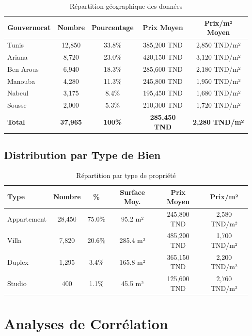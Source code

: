 \begin{table}[H]
\centering
\caption{Répartition géographique des données}
\begin{tabular}{|l|c|c|c|c|}
\hline
\textbf{Gouvernorat} & \textbf{Nombre} & \textbf{Pourcentage} & \textbf{Prix Moyen} & \textbf{Prix/m² Moyen} \\
\hline
Tunis & 12,850 & 33.8\% & 385,200 TND & 2,850 TND/m² \\
Ariana & 8,720 & 23.0\% & 420,150 TND & 3,120 TND/m² \\
Ben Arous & 6,940 & 18.3\% & 285,600 TND & 2,180 TND/m² \\
Manouba & 4,280 & 11.3\% & 245,800 TND & 1,950 TND/m² \\
Nabeul & 3,175 & 8.4\% & 195,450 TND & 1,680 TND/m² \\
Sousse & 2,000 & 5.3\% & 210,300 TND & 1,720 TND/m² \\
\hline
\textbf{Total} & \textbf{37,965} & \textbf{100\%} & \textbf{285,450 TND} & \textbf{2,280 TND/m²} \\
\hline
\end{tabular}
\end{table}

\subsection{Distribution par Type de Bien}

\begin{table}[H]
\centering
\caption{Répartition par type de propriété}
\begin{tabular}{|l|c|c|c|c|c|}
\hline
\textbf{Type} & \textbf{Nombre} & \textbf{\%} & \textbf{Surface Moy.} & \textbf{Prix Moyen} & \textbf{Prix/m²} \\
\hline
Appartement & 28,450 & 75.0\% & 95.2 m² & 245,800 TND & 2,580 TND/m² \\
Villa & 7,820 & 20.6\% & 285.4 m² & 485,200 TND & 1,700 TND/m² \\
Duplex & 1,295 & 3.4\% & 165.8 m² & 365,150 TND & 2,200 TND/m² \\
Studio & 400 & 1.1\% & 45.5 m² & 125,600 TND & 2,760 TND/m² \\
\hline
\end{tabular}
\end{table}

\section{Analyses de Corrélation}

